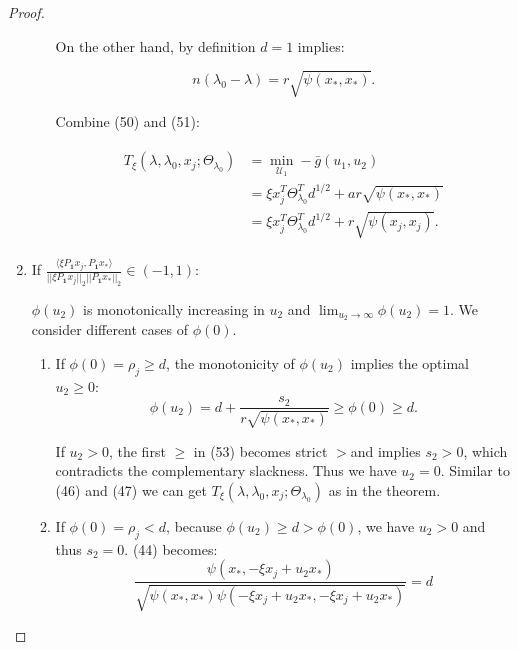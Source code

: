 \documentclass{article}
\begin{document}
\begin{proof}
\begin{enumerate}
\begin{enumerate}
        On the other hand, by definition $d=1$ implies:
        
        \begin{equation}
            n(\lambda_0-\lambda)=r\sqrt{\psi(x_*,x_*)}.
        \end{equation}
        
        Combine (50) and (51):
        
        \begin{gather}
            \begin{aligned}
                T_\xi(\lambda,\lambda_0,x_j;\Theta_{\lambda_0})&=\min_{\mathcal{U}_1}-\bar{g}(u_1,u_2)\\
                &=\xi x_j^T\Theta_{\lambda_0}^Td^{1/2}+ar\sqrt{\psi(x_*,x_*)}\\
                &=\xi x_j^T\Theta_{\lambda_0}^Td^{1/2}+r\sqrt{\psi(x_j,x_j)}.
            \end{aligned}
        \end{gather}
        
        
    \end{enumerate}
    
    \item If $\frac{\langle\xi P_{\mathbf{1}}x_j,P_{\mathbf{1}}x_*\rangle}{||\xi P_{\mathbf{1}}x_j||_2||P_{\mathbf{1}}x_*||_2}\in(-1,1)$:
    
    $\phi(u_2)$ is monotonically increasing in $u_2$ and $\lim_{u_2\xrightarrow{}\infty}\phi(u_2)=1$. We consider different cases of $\phi(0)$.
    
    \begin{enumerate}
        \item If $\phi(0)=\rho_j\geq d$, the monotonicity of $\phi(u_2)$ implies the optimal $u_2\geq 0$:
        \begin{equation}
            \phi(u_2)=d+\frac{s_2}{r\sqrt{\psi(x_*,x_*)}}\geq \phi(0)\geq d.
        \end{equation}
        
        If $u_2>0$, the first $\geq$ in (53) becomes strict $>$and implies $s_2>0$, which contradicts the complementary slackness. Thus we have $u_2=0$. Similar to (46) and (47) we can get $T_\xi(\lambda,\lambda_0,x_j;\Theta_{\lambda_0})$ as in the theorem.
        
        \item If $\phi(0)=\rho_j< d$, because $\phi(u_2)\geq d>\phi(0)$, we have $u_2>0$ and thus $s_2=0$. (44) becomes:
        \begin{equation}
            \frac{\psi(x_*,-\xi x_j+u_2x_*)}{\sqrt{\psi(x_*,x_*)\psi(-\xi x_j+u_2x_*,-\xi x_j+u_2x_*)}}=d
        \end{equation}
        

\end{enumerate}
\end{enumerate}
\end{proof}
\end{document}
